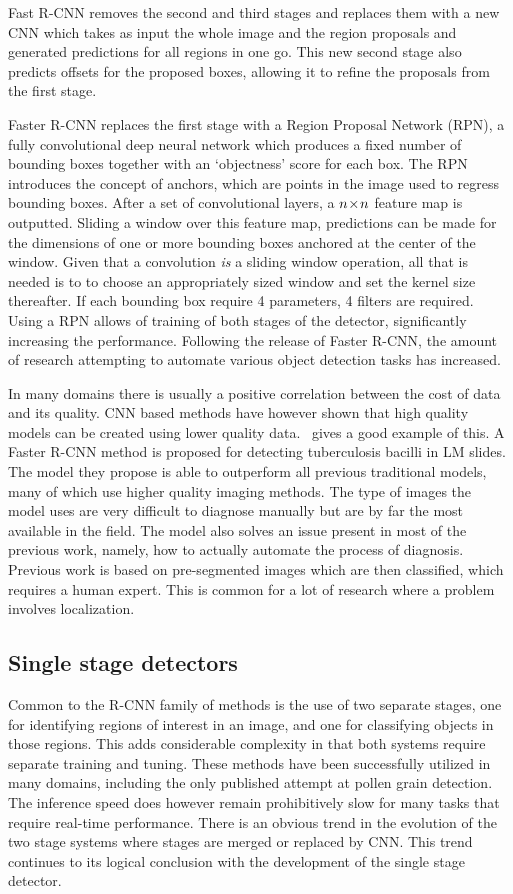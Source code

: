 Fast R-CNN removes the second and third stages and replaces them with a new CNN which takes as input the whole image and the region proposals and generated predictions for all regions in one go.
This new second stage also predicts offsets for the proposed boxes, allowing it to refine the proposals from the first stage.

Faster R-CNN replaces the first stage with a Region Proposal Network (RPN), a fully convolutional deep neural network which produces a fixed number of bounding boxes together with an `objectness' score for each box.
The RPN introduces the concept of anchors, which are points in the image used to regress bounding boxes.
After a set of convolutional layers, a \(n\!\times \! n\) feature map is outputted.
Sliding a window over this feature map, predictions can be made for the dimensions of one or more bounding boxes anchored at the center of the window.
Given that a convolution \textit{is} a sliding window operation, all that is needed is to to choose an appropriately sized window and set the kernel size thereafter.
If each bounding box require 4 parameters, 4 filters are required. 
Using a RPN allows of training of both stages of the detector, significantly increasing the performance.
Following the release of Faster R-CNN, the amount of research attempting to automate various object detection tasks has increased. 

In many domains there is usually a positive correlation between the cost of data and its quality.
CNN based methods have however shown that high quality models can be created using lower quality data.\ \textcite{el_melegy_automatic_2019} gives a good example of this.
A Faster R-CNN method is proposed for detecting tuberculosis bacilli in LM slides.
The model they propose is able to outperform all previous traditional models, many of which use higher quality imaging methods.
The type of images the model uses are very difficult to diagnose manually but are by far the most available in the field.
The model also solves an issue present in most of the previous work, namely, how to actually automate the process of diagnosis.
Previous work is based on pre-segmented images which are then classified, which requires a human expert.
This is common for a lot of research where a problem involves localization.

\subsection{Single stage detectors}\label{sec:ssd}
Common to the R-CNN family of methods is the use of two separate stages, one for identifying regions of interest in an image, and one for classifying objects in those regions.
This adds considerable complexity in that both systems require separate training and tuning.
These methods have been successfully utilized in many domains, including the only published attempt at pollen grain detection.
The inference speed does however remain prohibitively slow for many tasks that require real-time performance.
There is an obvious trend in the evolution of the two stage systems where stages are merged or replaced by CNN\@.
This trend continues to its logical conclusion with the development of the single stage detector.

